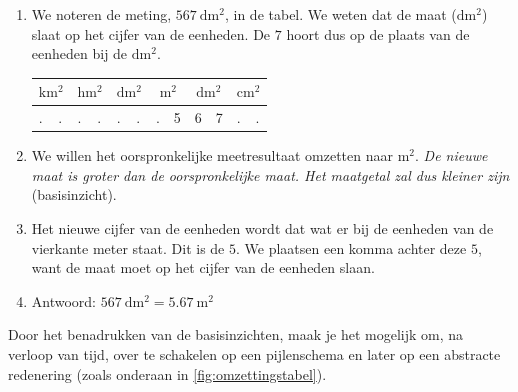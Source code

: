 \begin{multicols}{2}
\begin{enumerate}
\item We noteren de meting, \(\SI{567}{\deci\metre\squared}\), in de tabel.
We weten dat de maat (\(\si{\deci\metre\squared}\)) slaat op het cijfer van de eenheden.
De \(7\) hoort dus op de plaats van de eenheden bij de \(\si{\deci\metre\squared}\).

\begin{tabel}
    \begin{tabular}{|m{0.3cm}:m{0.3cm}|m{0.3cm}:m{0.3cm}|m{0.3cm}:m{0.3cm}|m{0.3cm}:m{0.3cm}|m{0.3cm}:m{0.3cm}|m{0.3cm}:m{0.3cm}|}
		\hline
         &  &  &  &  &  \\
        \hline
        .&.&.&.&.&.&.&5&6&7&.&.\\
        \hline
	\end{tabular}
\end{tabel}

\item We willen het oorspronkelijke meetresultaat omzetten naar \(\si{\metre\squared}\).
\emph{De nieuwe maat is groter dan de oorspronkelijke maat.
Het maatgetal zal dus kleiner zijn} (basisinzicht).

\item Het nieuwe cijfer van de eenheden wordt dat wat er bij de eenheden van de vierkante meter staat.
Dit is de \(5\).
We plaatsen een komma achter deze \(5\), want de maat moet op het cijfer van de eenheden slaan.

\item Antwoord: \(\SI{567}{\deci\metre\squared} = \SI{5.67}{\metre\squared}\)
\end{enumerate}

Door het benadrukken van de basisinzichten, maak je het mogelijk om, na verloop van tijd, over te schakelen op een pijlenschema en later op een abstracte redenering (zoals onderaan in \autoref{fig:omzettingstabel}).

\end{multicols}


